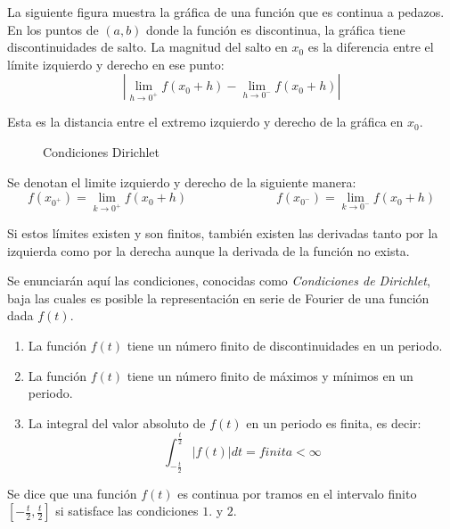 \documentclass[a4paper]{article}
\begin{document}
{} La siguiente figura muestra la gr\'afica de una funci\'on que es continua
a pedazos. En los puntos de $(a,b)$ donde la funci\'on es discontinua, la
gr\'afica tiene discontinuidades de salto. La magnitud del salto en $x_{0}$
es la diferencia entre el l\'imite izquierdo y derecho en ese punto:  
\[
\left|\lim_{h\to 0^{+}}f(x_{0}+h)-\lim_{h\to 0^{-}}f(x_{0}+h)\right|
\]

{} Esta es la distancia entre el extremo izquierdo y derecho de la gr\'afica
en $x_{0}$.  
\begin{figure}[h]
\caption{Condiciones Dirichlet}
\label{fig:limite}
\end{figure}

{} Se denotan el limite izquierdo y derecho de la siguiente manera:  
\[
f(x_{0^{+}})=\lim_{k\to 0^{+}}f(x_{0}+h) \hspace{3cm} f(x_{0^{-}})=\lim_{k%
\to 0^{-}}f(x_{0}+h) 
\]

{} Si estos l\'imites existen y son finitos, tambi\'en existen las derivadas
tanto por la izquierda como por la derecha aunque la derivada de la
funci\'on no exista. 

{} Se enunciar\'an aqu\'i las condiciones, conocidas como \textit{%
Condiciones de Dirichlet}, baja las cuales es posible la representaci\'on en
serie de Fourier de una funci\'on dada $f(t)$. 

\begin{enumerate}
\item La funci\'{o}n $f(t)$ tiene un n\'umero finito de discontinuidades en
un periodo. 

\item La funci\'{o}n $f(t)$ tiene un n\'umero finito de m\'aximos y
m\'inimos en un periodo. 

\item La integral del valor absoluto de $f(t)$ en un periodo es finita, es
decir:  
\[
\int_{-\frac{t}{2}}^{\frac{t}{2}}|f(t)|dt=finita<\infty
\]
\end{enumerate}

{} Se dice que una funci\'on $f(t)$ es continua por tramos en el intervalo
finito $\left[-\frac{t}{2},\frac{t}{2}\right]$ si satisface las condiciones $%
1$. y $2$.
\end{document}
